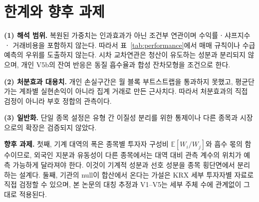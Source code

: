 \section{한계와 향후 과제}
\label{sec:limitations}

\textbf{(1) 해석 범위.} 복원된 가중치는 인과효과가 아닌 조건부 연관이며 수익률ㆍ샤프지수ㆍ
거래비용을 포함하지 않는다. 따라서 표~\ref{tab:performance}에서 매매 규칙이나 수급 예측의
우위를 도출하지 않는다. 시차 교차연관은 청산이 유도하는 성분과 분리되지 않으며, 개인
V5b의 잔여 반응은 동질 흡수율과 합성 잔차모형을 조건으로 한다.

\textbf{(2) 처분효과 대용치.} 개인 손실구간은 월 블록 부트스트랩을 통과하지 못했고,
평균단가는 계좌별 실현손익이 아니라 집계 거래로 만든 근사치다. 따라서 처분효과의 직접
검정이 아니라 부호 정합의 관측이다.

\textbf{(3) 일반화.} 단일 종목 설정은 유형 간 이질성 분리를 위한 통제이나 다른 종목과
시장으로의 확장은 검증되지 않았다.

\textbf{향후 과제.} 첫째, 기계 대역의 폭은 종목별
투자자 구성비 $\mathbb{E}[W_i/W_j]$와 흡수 몫의 함수이므로, 외국인 지분과 유동성이 다른
종목에서는 대역 대비 관측 계수의 위치가 예측 가능하게 달라져야 한다. 이것이 기계적 성분과
선호 성분을 종목 횡단면에서 분리하는 설계다. 둘째, 기관의 null이 합산에서 온다는 가설은
KRX 세부 투자자별 자료로 직접 검정할 수 있으며, 본 논문의 대칭 추정과 V1--V5는 세부 주체
수에 관계없이 그대로 적용된다.
